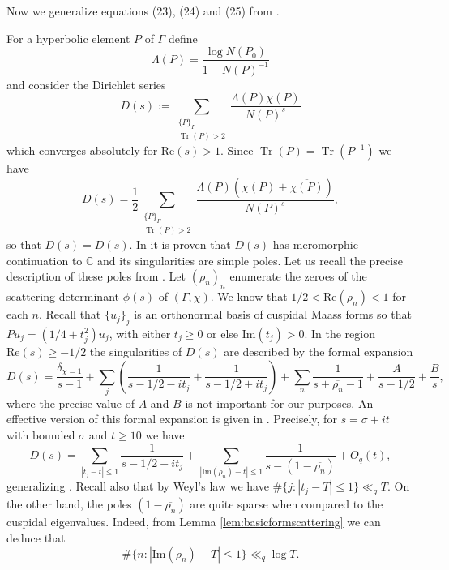 \documentclass{article}
\theoremstyle{named}
\newcommand{\CC}{\mathbb{C}}
\DeclareMathOperator{\Tr}{Tr}
\begin{document}
Now we generalize equations (23), (24) and (25) from \cite{Iwaniec1984}. 

For a hyperbolic element $P$ of $\Gamma$ define
\begin{equation*}
    \Lambda(P) = \frac{\log N(P_0)}{1 - N(P)^{-1}}
\end{equation*}
and consider the Dirichlet series 
\begin{equation*}
    D(s) := \sum_{\substack{\{P\}_\Gamma\\
    \Tr(P) > 2}} \frac{\Lambda(P) \chi(P)}{N(P)^s}
\end{equation*}
which converges absolutely for $\text{Re}(s) > 1$.
Since $\Tr(P) = \Tr(P^{-1})$ we have
\begin{equation*}
D(s) = \frac{1}{2}\sum_{\substack{\{P\}_\Gamma\\
    \Tr(P) > 2}} \frac{\Lambda(P) (\chi(P) + \overline{\chi(P)})}{N(P)^s},
\end{equation*}
so that $D(\overline{s}) = \overline{D(s)}$. In \cite[Chapter 10]{hejhal2} it is proven that $D(s)$ has meromorphic continuation to $\CC$ and its singularities are simple poles. Let us recall the precise description of these poles from \cite[Chapter 10, Theorem 2.16]{hejhal2}. Let $(\rho_n)_n$ enumerate the zeroes of the scattering determinant $\phi(s)$ of $(\Gamma, \chi)$. We know that $1/2 < \text{Re}(\rho_n) < 1$ for each $n$. Recall that $\{u_j\}_j$ is an orthonormal basis of cuspidal Maass forms so that $Pu_j = (1/4 + t_j^2)u_j$, with either $t_j \geq 0$ or else $\text{Im}(t_j) > 0$. In the region $\text{Re}(s) \geq -1/2$ the singularities of $D(s)$ are described by the formal expansion
\begin{equation}\label{eq:formalexpansionoflogarithmicselbergzeta}
    D(s) = \frac{\delta_{\chi = 1}}{s-1} + \sum_{j} \left(\frac{1}{s - 1/2 - it_j} + \frac{1}{s - 1/2 + it_j}\right) + \sum_{n}\frac{1}{s + \overline{\rho_n} - 1} + \frac{A}{s - 1/2} + \frac{B}{s},
\end{equation}
where the precise value of $A$ and $B$ is not important for our purposes. An effective version of this formal expansion is given in \cite[Chapter 10, Theorem 2.24(iv)]{hejhal2}. Precisely, for $s = \sigma + it$ with bounded $\sigma$ and $t \geq 10$ we have
\begin{equation}\label{eq:effecticexpansionoflogarithmicselbergzeta}
    D(s) = \sum_{|t_j - t| \leq 1}\frac{1}{s - 1/2 - it_j} + \sum_{|\text{Im}(\rho_n) - t| \leq 1}\frac{1}{s - (1 - \overline{\rho_n})} + O_q(t),
\end{equation}
generalizing \cite[Equation (20)]{Iwaniec1984}. Recall also that by Weyl's law we have $\#\{j : |t_j - T| \leq 1\}\ll_q T$. On the other hand, the poles $(1-\overline{\rho_n})$ are quite sparse when compared to the cuspidal eigenvalues. Indeed, from Lemma \ref{lem:basicformscattering} we can deduce that 
\begin{equation*}
    \#\{n : |\text{Im}(\rho_n)-T| \leq 1\} \ll_q \log T.
\end{equation*} 
\end{document}
